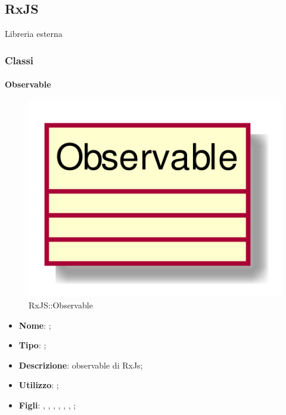 \subsection{RxJS}
Libreria esterna
\subsubsection{Classi}
\hypertarget{Observable_label}{\paragraph{Observable}}
\begin{figure}[h]
	\centering
	\includegraphics[width=\textwidth,height=\textheight,keepaspectratio]{images/ClassObservable.png}
	\caption{RxJS::Observable}
\end{figure}
\begin{itemize}
	\item \textbf{Nome}: ;
	\item \textbf{Tipo}: ;
	\item \textbf{Descrizione}: observable di RxJs;
	\item \textbf{Utilizzo}: ;
	\item \textbf{Figli}: , , , , , , ;
\end{itemize}
\FloatBarrier

